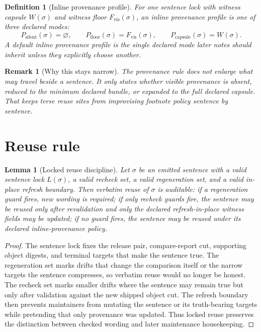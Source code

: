 \documentclass[11pt]{article}
\newtheorem{definition}{Definition}
\newtheorem{lemma}{Lemma}
\newtheorem{remark}{Remark}
\begin{document}
\begin{definition}[Inline provenance profile]
For one sentence lock with witness capsule $W(\sigma)$ and witness floor $F_{\mathrm{vis}}(\sigma)$, an \emph{inline provenance profile} is one of three declared modes:
\[
P_{\mathrm{silent}}(\sigma)=\varnothing,
\qquad P_{\mathrm{floor}}(\sigma)=F_{\mathrm{vis}}(\sigma),
\qquad P_{\mathrm{capsule}}(\sigma)=W(\sigma).
\]
A \emph{default inline provenance profile} is the single declared mode later notes should inherit unless they explicitly choose another.
\end{definition}

\begin{remark}[Why this stays narrow]
The provenance rule does not enlarge what may travel beside a sentence.
It only states whether visible provenance is absent, reduced to the minimum declared bundle, or expanded to the full declared capsule.
That keeps terse reuse sites from improvising footnote policy sentence by sentence.
\end{remark}

\section{Reuse rule}

\begin{lemma}[Locked reuse discipline]
Let $\sigma$ be an emitted sentence with a valid sentence lock $L(\sigma)$, a valid recheck set, a valid regeneration set, and a valid in-place refresh boundary.
Then verbatim reuse of $\sigma$ is auditable: if a regeneration guard fires, new wording is required; if only recheck guards fire, the sentence may be reused only after revalidation and only the declared refresh-in-place witness fields may be updated; if no guard fires, the sentence may be reused under its declared inline-provenance policy.
\end{lemma}

\begin{proof}
The sentence lock fixes the release pair, compare-report cut, supporting object digests, and terminal targets that make the sentence true.
The regeneration set marks drifts that change the comparison itself or the narrow targets the sentence compresses, so verbatim reuse would no longer be honest.
The recheck set marks smaller drifts where the sentence may remain true but only after validation against the new shipped object cut.
The refresh boundary then prevents maintainers from mutating the sentence or its truth-bearing targets while pretending that only provenance was updated.
Thus locked reuse preserves the distinction between checked wording and later maintenance housekeeping.
\end{proof}
\end{document}
